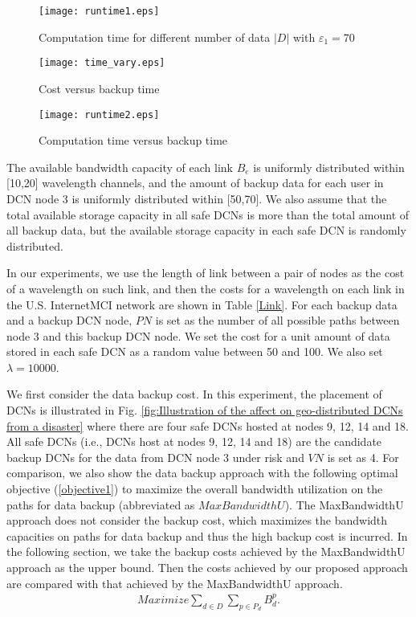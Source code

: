 \documentclass[conference]{IEEEtran}\IEEEoverridecommandlockouts
\begin{document}
\begin{figure}[t]
      \centering
      \texttt{[image: runtime1.eps]}
   \caption{Computation time  for different number of data $|D|$ with $\varepsilon_{1}=70$}
   \label{fig:Computation time versus total number of data}
  \end{figure}



\begin{figure}[t]
      \centering
      \texttt{[image: time\_vary.eps]}
   \caption{Cost versus backup time}
   \label{fig:Cost versus backup time}
  \end{figure}

\begin{figure}[t]
      \centering
      \texttt{[image: runtime2.eps]}
   \caption{Computation time versus backup time}
   \label{fig:Computation time versus backup time}
  \end{figure}


The available bandwidth capacity of each link $B_{e}$ is uniformly distributed within [10,20] wavelength channels,
and the  amount of backup data for each user in DCN node 3 is uniformly distributed within [50,70].
We also assume that the total available storage capacity  in all safe DCNs is more than the total amount of all backup data, but the available storage capacity in each safe DCN is randomly distributed.

In our experiments,  we use the length of link between a pair of nodes as the cost of a wavelength on such link, and then the costs for a wavelength on each link in  the U.S. InternetMCI network are shown in Table \ref{Link}. For each backup data and a backup DCN node, $PN$ is set as  the number of all possible paths between node 3 and this backup DCN node.  We  set the cost for a unit amount of data stored in each safe DCN as a random value between 50 and 100.
We also set  $\lambda=10000$.

We first consider the data backup cost. In this experiment, the placement of DCNs is illustrated in Fig. \ref{fig:Illustration of the affect on geo-distributed DCNs from a disaster} where there are four safe DCNs hosted at nodes 9, 12, 14 and 18.
All safe DCNs (i.e., DCNs host at nodes  9, 12, 14 and 18) are the candidate backup DCNs for the data from DCN node 3 under risk and $VN$ is set as 4. For comparison,  we also show the data backup approach  with  the  following optimal objective (\ref{objective1}) to maximize the overall bandwidth  utilization  on the paths for data backup (abbreviated as $MaxBandwidthU$). The MaxBandwidthU approach does not consider the backup cost,  which maximizes  the bandwidth  capacities on paths for data backup  and thus the high backup cost is incurred. In the following section, we take the backup costs achieved by the MaxBandwidthU approach as the upper bound. Then the costs achieved by our proposed approach are compared  with that achieved by the MaxBandwidthU approach.
 \begin{eqnarray}\label{objective1}
   Maximize\sum\limits_{d \in D}\sum\limits_{p\in P_{d}}B_{d}^{p}.
  \end{eqnarray}
\end{document}
